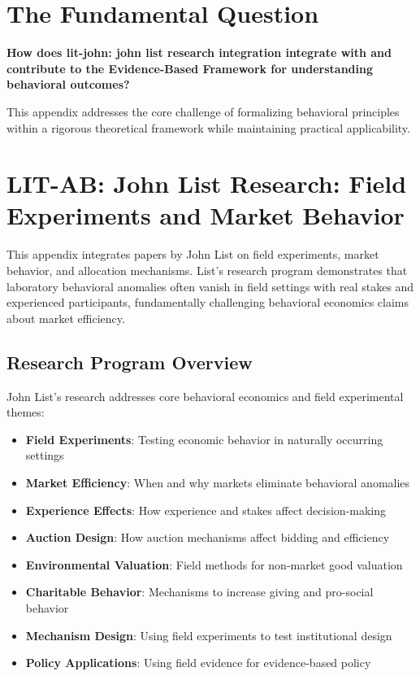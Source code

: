 \section{The Fundamental Question}
\label{sec:lis-fundamental}

\begin{tcolorbox}[
    colback=red!5!white,
    colframe=red!75!black,
    title={\textbf{Fundamental Question}}
]
\textbf{How does lit-john: john list research integration integrate with and contribute to the
Evidence-Based Framework for understanding behavioral outcomes?}

This appendix addresses the core challenge of formalizing behavioral principles
within a rigorous theoretical framework while maintaining practical applicability.
\end{tcolorbox}




\section{LIT-AB: John List Research: Field Experiments and Market Behavior}
\label{app:litab}

This appendix integrates papers by John List on field experiments, market behavior, and allocation
mechanisms. List's research program demonstrates that laboratory behavioral anomalies often vanish
in field settings with real stakes and experienced participants, fundamentally challenging behavioral
economics claims about market efficiency.

\subsection{Research Program Overview}

John List's research addresses core behavioral economics and field experimental themes:

\begin{itemize}
  \item \textbf{Field Experiments}: Testing economic behavior in naturally occurring settings
  \item \textbf{Market Efficiency}: When and why markets eliminate behavioral anomalies
  \item \textbf{Experience Effects}: How experience and stakes affect decision-making
  \item \textbf{Auction Design}: How auction mechanisms affect bidding and efficiency
  \item \textbf{Environmental Valuation}: Field methods for non-market good valuation
  \item \textbf{Charitable Behavior}: Mechanisms to increase giving and pro-social behavior
  \item \textbf{Mechanism Design}: Using field experiments to test institutional design
  \item \textbf{Policy Applications}: Using field evidence for evidence-based policy
\end{itemize}

